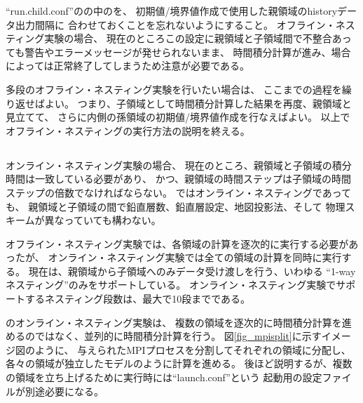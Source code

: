 \noindent ``run.child.conf''のの中のを、
初期値/境界値作成で使用した親領域のhistoryデータ出力間隔に
合わせておくことを忘れないようにすること。
オフライン・ネスティング実験の場合、
現在のところこの設定に親領域と子領域間で不整合あっても警告やエラーメッセージが発せられないまま、
時間積分計算が進み、場合によっては正常終了してしまうため注意が必要である。

多段のオフライン・ネスティング実験を行いたい場合は、
ここまでの過程を繰り返せばよい。
つまり、子領域として時間積分計算した結果を再度、親領域と見立てて、
さらに内側の孫領域の初期値/境界値作成を行なえばよい。
以上でオフライン・ネスティングの実行方法の説明を終える。


\subsection{\SubsecOnlineNesting} \label{subsec:nest_online}

オンライン・ネスティング実験の場合、
現在のところ、親領域と子領域の積分時間は一致している必要があり、
かつ、親領域の時間ステップは子領域の時間ステップの倍数でなければならない。
\scalerm ではオンライン・ネスティングであっても、
親領域と子領域の間で鉛直層数、鉛直層設定、地図投影法、そして
物理スキームが異なっていても構わない。

オフライン・ネスティング実験では、各領域の計算を逐次的に実行する必要があったが、
オンライン・ネスティング実験では全ての領域の計算を同時に実行する。
現在は、親領域から子領域へのみデータ受け渡しを行う、いわゆる
``1-wayネスティング''のみをサポートしている。
オンライン・ネスティング実験でサポートするネスティング段数は、最大で10段までである。

\scalerm のオンライン・ネスティング実験は、
複数の領域を逐次的に時間積分計算を進めるのではなく、並列的に時間積分計算を行う。
図\ref{fig_mpisplit}に示すイメージ図のように、
与えられたMPIプロセスを分割してそれぞれの領域に分配し、
各々の領域が独立したモデルのように計算を進める。
後ほど説明するが、複数の領域を立ち上げるために実行時には``launch.conf''という
起動用の設定ファイルが別途必要になる。

